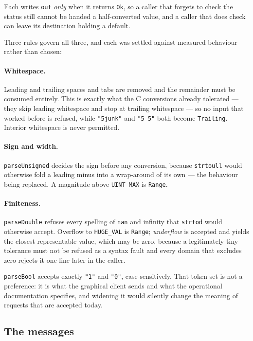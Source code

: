 Each writes \texttt{out} \emph{only} when it returns \texttt{Ok}, so a caller
that forgets to check the status still cannot be handed a half-converted
value, and a caller that does check can leave its destination holding a
default.

Three rules govern all three, and each was settled against measured
behaviour rather than chosen:

\paragraph{Whitespace.}  Leading and trailing spaces and tabs are removed and
the remainder must be consumed entirely.  This is exactly what the C
conversions already tolerated --- they skip leading whitespace and stop at
trailing whitespace --- so no input that worked before is refused, while
\texttt{"5junk"} and \texttt{"5 5"} both become \texttt{Trailing}.  Interior
whitespace is never permitted.

\paragraph{Sign and width.}  \texttt{parseUnsigned} decides the sign before any
conversion, because \texttt{strtoull} would otherwise fold a leading minus into
a wrap-around of its own --- the behaviour being replaced.  A magnitude above
\texttt{UINT\_MAX} is \texttt{Range}.

\paragraph{Finiteness.}  \texttt{parseDouble} refuses every spelling of
\texttt{nan} and infinity that \texttt{strtod} would otherwise accept.
Overflow to \texttt{HUGE\_VAL} is \texttt{Range}; \emph{underflow} is accepted
and yields the closest representable value, which may be zero, because a
legitimately tiny tolerance must not be refused as a syntax fault and every
domain that excludes zero rejects it one line later in the caller.

\texttt{parseBool} accepts exactly \texttt{"1"} and \texttt{"0"},
case-sensitively.  That token set is not a preference: it is what the graphical
client sends and what the operational documentation specifies, and widening it
would silently change the meaning of requests that are accepted today.

\subsection{The messages}

